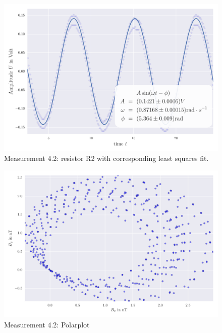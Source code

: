 \begin{figure}[H]
    \centering
    \includegraphics[width=0.7\linewidth]{analysis/figures/fit4_2}
    \caption{Measurement 4.2: resistor R2 with corresponding least squares fit.}
    \label{fig:4_2_plot}
\end{figure}
\begin{figure}[H]
    \centering
    \includegraphics[width=0.7\linewidth]{analysis/figures/polar4_2}
    \caption{Measurement 4.2: Polarplot}
    \label{fig:4_2_polar}
\end{figure}

